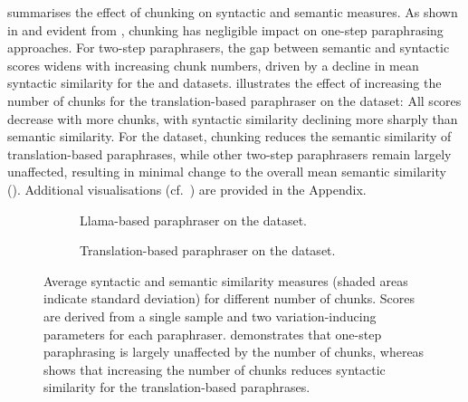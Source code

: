  summarises the effect of chunking on syntactic and semantic measures. 
As shown in  and evident from , chunking has negligible impact on one-step paraphrasing approaches. 
For two-step paraphrasers, the gap between semantic and syntactic scores widens with increasing chunk numbers, driven by a decline in mean syntactic similarity for the \dataBlog{} and \dataStudent{} datasets.
 illustrates the effect of increasing the number of chunks for the translation-based paraphraser on the \dataBlog{} dataset: 
All scores decrease with more chunks, with syntactic similarity declining more sharply than semantic similarity.
For the \dataGutenberg{} dataset, chunking reduces the semantic similarity of translation-based paraphrases, while other two-step paraphrasers remain largely unaffected, resulting in minimal change to the overall mean semantic similarity (). 
Additional visualisations (cf.~) are provided in the Appendix.

\begin{figure}[H]
  \centering
  \begin{subfigure}[b]{\textwidth}
    \centering
    
    \caption[Llama-based paraphraser on \dataStudent{}]{Llama-based paraphraser on the \dataStudent{} dataset.
    }
    \label{fig:abl_chunks_student_essays_llama}
  \end{subfigure}

  \hfill

  \begin{subfigure}[b]{\textwidth}
    \centering
    
    \caption[Translation-based paraphraser on \dataBlog{}]{
    Translation-based paraphraser on the \dataBlog{} dataset.    
    }
    \label{fig:abl_chunks_blog_translation}
  \end{subfigure}
  \caption[Effect of chunking on syntactic and semantic measures]{Average syntactic and semantic similarity measures (shaded areas indicate standard deviation) for different number of chunks.
  Scores are derived from a single sample and two variation-inducing parameters for each paraphraser.
   demonstrates that one-step paraphrasing is largely unaffected by the number of chunks, whereas  shows that increasing the number of chunks reduces syntactic similarity for the translation-based paraphrases.
  }
  \label{fig:abl_chunks}
\end{figure}

